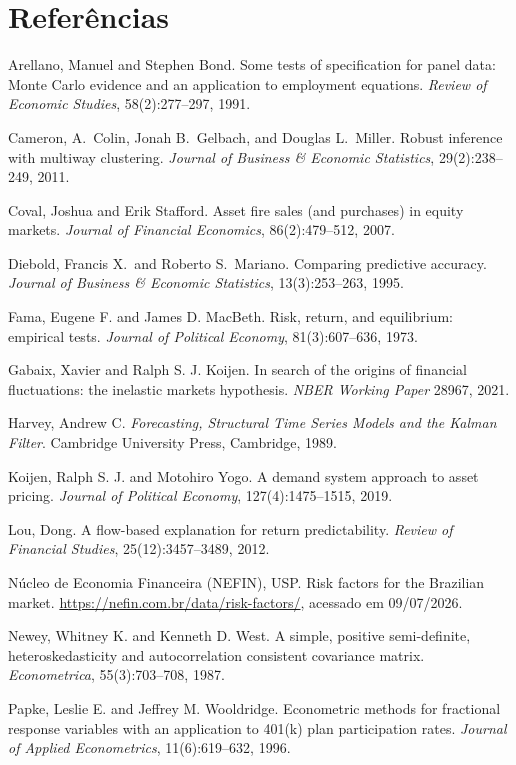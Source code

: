 \documentclass[12pt,a4paper]{article}
\begin{document}
\newpage
{}
\section*{Referências}
\small
\begin{description}
\item Arellano, Manuel and Stephen Bond. Some tests of specification for panel data: Monte Carlo
evidence and an application to employment equations. \emph{Review of Economic Studies},
58(2):277--297, 1991.
\item Cameron, A.\ Colin, Jonah B.\ Gelbach, and Douglas L.\ Miller. Robust inference with
multiway clustering. \emph{Journal of Business \& Economic Statistics}, 29(2):238--249, 2011.
\item Coval, Joshua and Erik Stafford. Asset fire sales (and purchases) in equity markets.
\emph{Journal of Financial Economics}, 86(2):479--512, 2007.
\item Diebold, Francis X.\ and Roberto S.\ Mariano. Comparing predictive accuracy. \emph{Journal
of Business \& Economic Statistics}, 13(3):253--263, 1995.
\item Fama, Eugene F. and James D. MacBeth. Risk, return, and equilibrium: empirical tests.
\emph{Journal of Political Economy}, 81(3):607--636, 1973.
\item Gabaix, Xavier and Ralph S. J. Koijen. In search of the origins of financial fluctuations:
the inelastic markets hypothesis. \emph{NBER Working Paper} 28967, 2021.
\item Harvey, Andrew C. \emph{Forecasting, Structural Time Series Models and the Kalman Filter}.
Cambridge University Press, Cambridge, 1989.
\item Koijen, Ralph S. J. and Motohiro Yogo. A demand system approach to asset pricing.
\emph{Journal of Political Economy}, 127(4):1475--1515, 2019.
\item Lou, Dong. A flow-based explanation for return predictability. \emph{Review of Financial
Studies}, 25(12):3457--3489, 2012.
\item Núcleo de Economia Financeira (NEFIN), USP. Risk factors for the Brazilian market.
\url{https://nefin.com.br/data/risk-factors/}, acessado em 09/07/2026.
\item Newey, Whitney K. and Kenneth D. West. A simple, positive semi-definite, heteroskedasticity
and autocorrelation consistent covariance matrix. \emph{Econometrica}, 55(3):703--708, 1987.
\item Papke, Leslie E. and Jeffrey M. Wooldridge. Econometric methods for fractional response
variables with an application to 401(k) plan participation rates. \emph{Journal of Applied
Econometrics}, 11(6):619--632, 1996.
\end{description}
\end{document}
